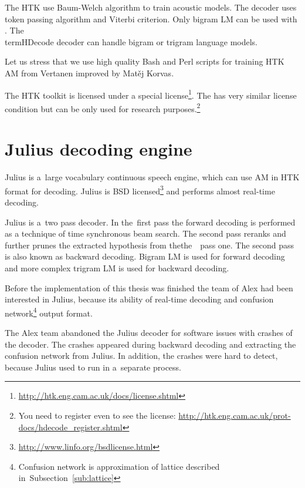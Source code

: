 {The \ac{HTK} use Baum-Welch algorithm to train acoustic models.
The  decoder uses token passing algorithm and Viterbi criterion.
\cite{HTKBook3.4} %
Only bigram \ac{LM} can be used with .
The \\term{HDecode} decoder can handle bigram or trigram language models. 


Let us stress that we use high quality Bash and Perl scripts for training \ac{HTK} \ac{AM}
from Vertanen improved by Matěj Korvas.\cite{vertanen_baseline_2006}\cite{korvas_2014}

The \ac{HTK} toolkit is licensed under a special license\footnote{\url{http://htk.eng.cam.ac.uk/docs/license.shtml}}.
The  has very similar license condition but can be only used for research purposes.\footnote{You
need to register even to see the license: \url{http://htk.eng.cam.ac.uk/prot-docs/hdecode_register.shtml}}

\section{Julius decoding engine}
\label{sec:back_julius}

Julius is a~large vocabulary continuous speech engine, which can use \ac{AM} in \ac{HTK} format for decoding.\cite{lee2009julius}
Julius is BSD licensed\footnote{\url{http://www.linfo.org/bsdlicense.html}} and performs almost real-time decoding.

Julius is a~two pass decoder. In the~first pass the forward decoding is performed as
a technique of time synchronous beam search.
The second pass reranks and further prunes the extracted hypothesis from thethe~~pass one.
The second pass is also known as backward decoding.
Bigram \ac{LM} is used for forward decoding and more complex trigram \ac{LM} is used for backward decoding.

Before the implementation of this thesis was finished 
the team of Alex had been interested in Julius, because its ability of real-time decoding 
and confusion 
network\footnote{Confusion network is approximation of lattice described in~Subsection~\ref{sub:lattice}} 
output format.

The Alex team abandoned the Julius decoder for software issues with crashes of the decoder. 
The crashes appeared during backward decoding and extracting the confusion network from Julius. 
In addition, the crashes were hard to detect, because Julius used to run in a~separate process.

}
